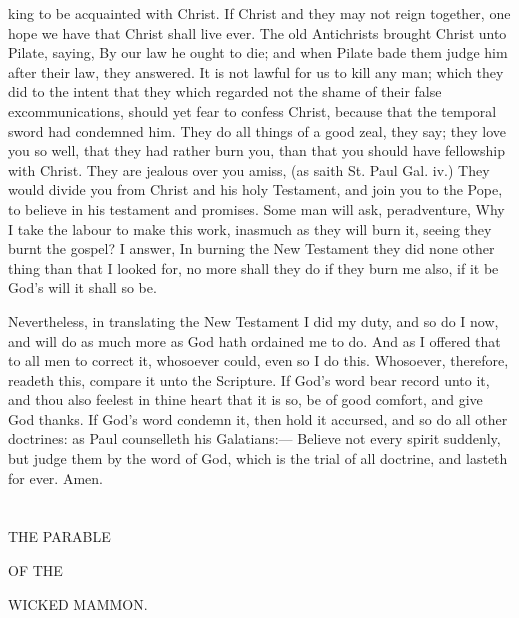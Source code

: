 \documentclass{custom}
\begin{document}
king to be acquainted with Christ. If Christ and 
they may not reign together, one hope we have 
that Christ shall live ever. The old Antichrists 
brought Christ unto Pilate, saying, By our law 
he ought to die; and when Pilate bade them 
judge him after their law, they answered. It is 
not lawful for us to kill any man; which they did 
to the intent that they which regarded not the 
shame of their false excommunications, should 
yet fear to confess Christ, because that the
temporal sword had condemned him. They do all 
things of a good zeal, they say; they love you 
so well, that they had rather burn you, than that 
you should have fellowship with Christ. They 
are jealous over you amiss, (as saith St. Paul 
Gal. iv.) They would divide you from Christ and 
his holy Testament, and join you to the Pope, 
to believe in his testament and promises. Some 
man will ask, peradventure, Why I take the 
labour to make this work, inasmuch as they will 
burn it, seeing they burnt the gospel? I answer, 
In burning the New Testament they did none 
other thing than that I looked for, no more shall 
they do if they burn me also, if it be God's will 
it shall so be. 

Nevertheless, in translating the New Testament 
I did my duty, and so do I now, and will do as 
much more as God hath ordained me to do. And 
as I offered that to all men to correct it,
whosoever could, even so I do this. Whosoever, 
therefore, readeth this, compare it unto the 
Scripture. If God's word bear record unto it, 
and thou also feelest in thine heart that it is so, 
be of good comfort, and give God thanks. If 
God's word condemn it, then hold it accursed, 
and so do all other doctrines: as Paul
counselleth his Galatians:— Believe not every spirit 
suddenly, but judge them by the word of God, 
which is the trial of all doctrine, and lasteth for 
ever. Amen. 

\section*{}
\begin{center}
THE PARABLE 

OF THE 

WICKED MAMMON. 
\end{center}
\end{document}
